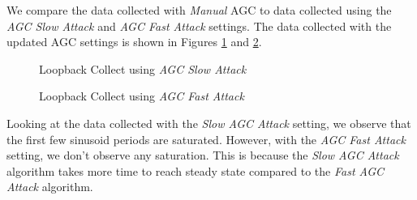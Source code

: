 \documentclass{article}
\begin{document}
We compare the data collected with \textit{Manual} AGC to data collected using the \textit{AGC Slow Attack} and \textit{AGC Fast Attack} settings. The data collected with the updated AGC settings is shown in Figures \ref{fig::matlab_loopback_agc_slow_attack} and \ref{fig::matlab_loopback_agc_fast_attack}.

\begin{figure}[H]
	\centerline{}
	\caption{Loopback Collect using \textit{AGC Slow Attack}}
	\label{fig::matlab_loopback_agc_slow_attack}
\end{figure}

\begin{figure}[H]
	\centerline{}
	\caption{Loopback Collect using \textit{AGC Fast Attack}}
	\label{fig::matlab_loopback_agc_fast_attack}
\end{figure}

Looking at the data collected with the \textit{Slow AGC Attack} setting, we observe that the first few sinusoid periods are saturated. However, with the \textit{AGC Fast Attack} setting, we don't observe any saturation. This is because the \textit{Slow AGC Attack} algorithm takes more time to reach steady state compared to the \textit{Fast AGC Attack} algorithm.
\end{document}
